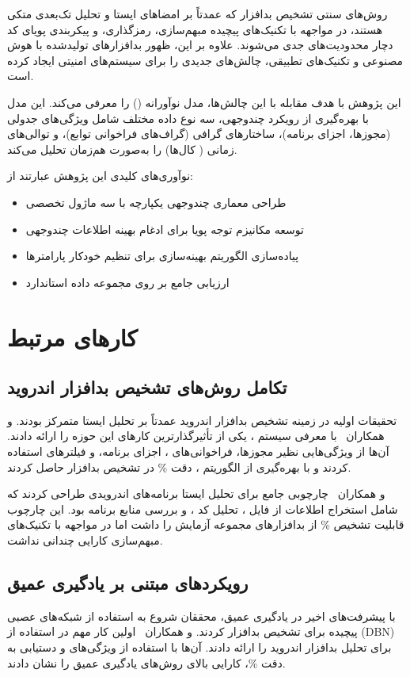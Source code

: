 \documentclass[a4paper,oneside,12pt]{report}
\theoremstyle{definition}
\begin{document}
روش‌های سنتی تشخیص بدافزار که عمدتاً بر امضاهای ایستا و تحلیل تک‌بعدی متکی هستند، در مواجهه با تکنیک‌های پیچیده مبهم‌سازی، رمزگذاری، و پیکربندی پویای کد دچار محدودیت‌های جدی می‌شوند. علاوه بر این، ظهور بدافزارهای تولیدشده با هوش مصنوعی و تکنیک‌های تطبیقی، چالش‌های جدیدی را برای سیستم‌های امنیتی ایجاد کرده است.

این پژوهش با هدف مقابله با این چالش‌ها، مدل نوآورانه  () را معرفی می‌کند. این مدل با بهره‌گیری از رویکرد چندوجهی، سه نوع داده مختلف شامل ویژگی‌های جدولی (مجوزها، اجزای برنامه)، ساختارهای گرافی (گراف‌های فراخوانی توابع)، و توالی‌های زمانی ( کال‌ها) را به‌صورت هم‌زمان تحلیل می‌کند.

نوآوری‌های کلیدی این پژوهش عبارتند از:
\begin{itemize}
  \item طراحی معماری چندوجهی یکپارچه با سه ماژول تخصصی
  \item توسعه مکانیزم توجه پویا برای ادغام بهینه اطلاعات چندوجهی
  \item پیاده‌سازی الگوریتم بهینه‌سازی  برای تنظیم خودکار پارامترها
  \item ارزیابی جامع بر روی مجموعه داده استاندارد 
\end{itemize}

\section{کارهای مرتبط}
\subsection{تکامل روش‌های تشخیص بدافزار اندروید}
تحقیقات اولیه در زمینه تشخیص بدافزار اندروید عمدتاً بر تحلیل ایستا متمرکز بودند.  و همکاران~\cite{DrebinPaper} با معرفی سیستم ، یکی از تأثیرگذارترین کارهای این حوزه را ارائه دادند. آن‌ها از ویژگی‌هایی نظیر مجوزها، فراخوانی‌های ، اجزای برنامه، و فیلترهای  استفاده کردند و با بهره‌گیری از الگوریتم ، دقت \% در تشخیص بدافزار حاصل کردند.

 و همکاران~\cite{StaticAnalysisFramework} چارچوبی جامع برای تحلیل ایستا برنامه‌های اندرویدی طراحی کردند که شامل استخراج اطلاعات از فایل ، تحلیل کد ، و بررسی منابع برنامه بود. این چارچوب قابلیت تشخیص \% از بدافزارهای مجموعه آزمایش را داشت اما در مواجهه با تکنیک‌های مبهم‌سازی کارایی چندانی نداشت.

\subsection{رویکردهای مبتنی بر یادگیری عمیق}
با پیشرفت‌های اخیر در یادگیری عمیق، محققان شروع به استفاده از شبکه‌های عصبی پیچیده برای تشخیص بدافزار کردند.  و همکاران~\cite{DeepDroid} اولین کار مهم در استفاده از  (DBN) برای تحلیل بدافزار اندروید را ارائه دادند. آن‌ها با استفاده از ویژگی‌های  و دستیابی به دقت \%، کارایی بالای روش‌های یادگیری عمیق را نشان دادند.
\end{document}
